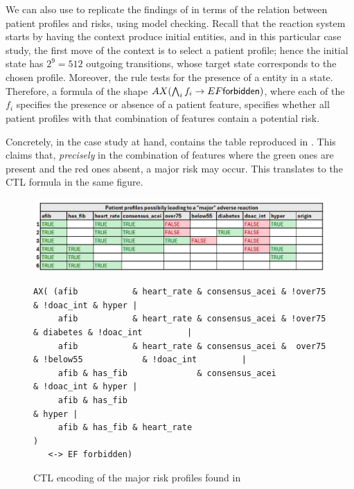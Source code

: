 \medskip\noindent We can also use \GROOVE to replicate the findings of  \cite[Fig.\ 6]{DBLP:conf/cmsb/BowlesBBFGM24} in terms of the relation between patient profiles and risks, using model checking. Recall that the reaction system starts by having the context produce initial entities, and in this particular case study, the first move of the context is to select a patient profile; hence the initial state has $2^9=512$ outgoing transitions, whose target state corresponds to the chosen profile. Moreover, the rule \forbidden tests for the presence of a \Forbidden entity in a state. Therefore, a formula of the shape
$AX(\bigwedge_i f_i \rightarrow EF {\text{\sffamily forbidden}})$, where each of the $f_i$ specifies the presence or absence of a patient feature, specifies whether all patient profiles with that combination of features contain a potential risk.

Concretely, in the case study at hand, \cite[Fig.~6]{DBLP:conf/cmsb/BowlesBBFGM24} contains the table reproduced in . This claims that, \emph{precisely} in the combination of features where the green ones are present and the red ones absent, a major risk may occur. This translates to the CTL formula in the same figure.

\begin{figure}
\centering
\includegraphics[scale=.4]{./figs/table-from-cmsb2024}\begin{lstlisting}[basicstyle=\ttfamily\small,xleftmargin=0cm]
AX( (afib           & heart_rate & consensus_acei & !over75                       & !doac_int & hyper |
     afib           & heart_rate & consensus_acei & !over75            & diabetes & !doac_int         |
     afib           & heart_rate & consensus_acei &  over75 & !below55            & !doac_int         |
     afib & has_fib              & consensus_acei                                 & !doac_int & hyper |
     afib & has_fib                                                                           & hyper |
     afib & has_fib & heart_rate                                                                      )
   <-> EF forbidden)
\end{lstlisting}
\caption{CTL encoding of the major risk profiles found in \cite[Fig.~6]{DBLP:conf/cmsb/BowlesBBFGM24}}
\label{fig:table-from-cmsb2024}
\end{figure}

